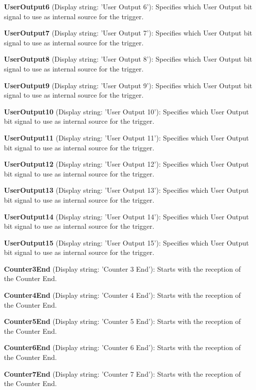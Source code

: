 \begin{DoxyItemize}
\item {\bfseries User\+Output6} (Display string\+: 'User Output 6')\+: Specifies which User Output bit signal to use as internal source for the trigger.
\item {\bfseries User\+Output7} (Display string\+: 'User Output 7')\+: Specifies which User Output bit signal to use as internal source for the trigger.
\item {\bfseries User\+Output8} (Display string\+: 'User Output 8')\+: Specifies which User Output bit signal to use as internal source for the trigger.
\item {\bfseries User\+Output9} (Display string\+: 'User Output 9')\+: Specifies which User Output bit signal to use as internal source for the trigger.
\item {\bfseries User\+Output10} (Display string\+: 'User Output 10')\+: Specifies which User Output bit signal to use as internal source for the trigger.
\item {\bfseries User\+Output11} (Display string\+: 'User Output 11')\+: Specifies which User Output bit signal to use as internal source for the trigger.
\item {\bfseries User\+Output12} (Display string\+: 'User Output 12')\+: Specifies which User Output bit signal to use as internal source for the trigger.
\item {\bfseries User\+Output13} (Display string\+: 'User Output 13')\+: Specifies which User Output bit signal to use as internal source for the trigger.
\item {\bfseries User\+Output14} (Display string\+: 'User Output 14')\+: Specifies which User Output bit signal to use as internal source for the trigger.
\item {\bfseries User\+Output15} (Display string\+: 'User Output 15')\+: Specifies which User Output bit signal to use as internal source for the trigger.
\item {\bfseries Counter3\+End} (Display string\+: 'Counter 3 End')\+: Starts with the reception of the Counter End.
\item {\bfseries Counter4\+End} (Display string\+: 'Counter 4 End')\+: Starts with the reception of the Counter End.
\item {\bfseries Counter5\+End} (Display string\+: 'Counter 5 End')\+: Starts with the reception of the Counter End.
\item {\bfseries Counter6\+End} (Display string\+: 'Counter 6 End')\+: Starts with the reception of the Counter End.
\item {\bfseries Counter7\+End} (Display string\+: 'Counter 7 End')\+: Starts with the reception of the Counter End.

\end{DoxyItemize}
